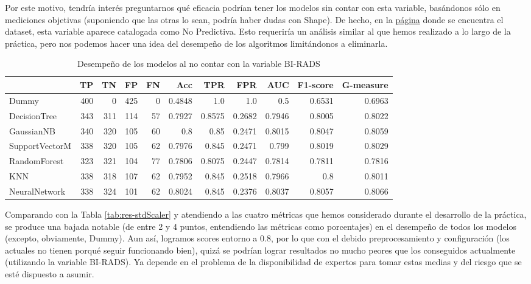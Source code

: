 \documentclass{article}
\begin{document}
Por este motivo, tendría interés preguntarnos qué eficacia podrían
tener los modelos sin contar con esta variable, basándonos sólo en
mediciones objetivas (suponiendo que las otras lo sean, podría haber
dudas con Shape). De hecho, en la
\href{https://bigml.com/user/TotyB/gallery/dataset/509a98c6035d0706dd0001dd}{página}
donde se encuentra el dataset, esta variable aparece catalogada como
No Predictiva. Esto requeriría un análisis similar al que hemos
realizado a lo largo de la práctica, pero nos podemos hacer una idea
del desempeño de los algoritmos limitándonos a eliminarla.

\begin{table}[H]
\centering
\caption{Desempeño de los modelos al no contar con la variable BI-RADS}
\label{tab:noBiRads}
\begin{tabular}{|lrrrrrrrrrr|}
\hline
 & TP & TN & FP & FN & Acc & TPR & FPR & AUC & F1-score & G-measure\\ \hline
Dummy & 400 & 0 & 425 & 0 & 0.4848 & 1.0 & 1.0 & 0.5 & 0.6531 & 0.6963\\
DecisionTree & 343 & 311 & 114 & 57 & 0.7927 & 0.8575 & 0.2682 & 0.7946 & 0.8005 & 0.8022\\
GaussianNB & 340 & 320 & 105 & 60 & 0.8 & 0.85 & 0.2471 & 0.8015 & 0.8047 & 0.8059\\
SupportVectorM & 338 & 320 & 105 & 62 & 0.7976 & 0.845 & 0.2471 & 0.799 & 0.8019 & 0.8029\\
RandomForest & 323 & 321 & 104 & 77 & 0.7806 & 0.8075 & 0.2447 & 0.7814 & 0.7811 & 0.7816\\
KNN & 338 & 318 & 107 & 62 & 0.7952 & 0.845 & 0.2518 & 0.7966 & 0.8 & 0.8011\\
NeuralNetwork & 338 & 324 & 101 & 62 & 0.8024 & 0.845 & 0.2376 & 0.8037 & 0.8057 & 0.8066\\
\hline
\end{tabular}
\end{table}

Comparando con la Tabla \ref{tab:res-stdScaler} y atendiendo a las
cuatro métricas que hemos considerado durante el desarrollo de la
práctica, se produce una bajada notable (de entre 2 y 4 puntos,
entendiendo las métricas como porcentajes) en el desempeño de todos
los modelos (excepto, obviamente, Dummy). Aun así, logramos scores
entorno a 0.8, por lo que con el debido preprocesamiento y
configuración (los actuales no tienen porqué seguir funcionando bien),
quizá se podrían lograr resultados no mucho peores que los conseguidos
actualmente (utilizando la variable BI-RADS). Ya depende en el
problema de la disponibilidad de expertos para tomar estas medias y
del riesgo que se esté dispuesto a asumir.
\end{document}
